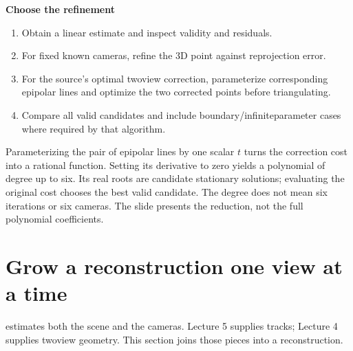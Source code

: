 \documentclass[letterpaper,11pt,english,openany,oneside]{jupyterBook}
\begin{document}
\begin{TextbookBox}
\textbf{Choose the refinement}\par\smallskip
\begin{enumerate}
%
\item {}
\sphinxAtStartPar
Obtain a linear estimate and inspect validity and residuals.

\item {}
\sphinxAtStartPar
For fixed known cameras, refine the 3D point against reprojection error.

\item {}
\sphinxAtStartPar
For the source’s optimal two\sphinxhyphen{}view correction, parameterize corresponding epipolar lines and optimize the two corrected points before triangulating.

\item {}
\sphinxAtStartPar
Compare all valid candidates and include boundary/infinite\sphinxhyphen{}parameter cases where required by that algorithm.

\end{enumerate}

\end{TextbookBox}

\sphinxAtStartPar
{} Parameterizing the pair of epipolar lines by one scalar \(t\) turns the correction cost into a rational function. Setting its derivative to zero yields a polynomial of degree up to six. Its real roots are candidate stationary solutions; evaluating the original cost chooses the best valid candidate. The degree does not mean six iterations or six cameras. The slide presents the reduction, not the full polynomial coefficients.

\ignorespaces
{}\ignorespaces
\sphinxstepscope


\section{Grow a reconstruction one view at a time}
\label{\detokenize{lectures/lecture06/pipeline:grow-a-reconstruction-one-view-at-a-time}}\label{\detokenize{lectures/lecture06/pipeline:lec06-pipeline}}\label{\detokenize{lectures/lecture06/pipeline::doc}}
\sphinxAtStartPar
{} estimates both the scene and the cameras. Lecture 5 supplies tracks; Lecture 4 supplies two\sphinxhyphen{}view geometry. This section joins those pieces into a reconstruction.
\end{document}
